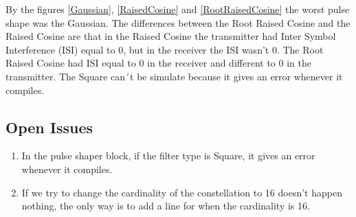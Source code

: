 By the figures \ref{Gaussian}, \ref{RaisedCosine} and \ref{RootRaisedCosine} the worst pulse shape was the Gaussian. The differences between the Root Raised Cosine and the Raised Cosine are that in the Raised Cosine the transmitter had Inter Symbol Interference (ISI) equal to 0, but in the receiver the ISI wasn't 0. The Root Raised Cosine had ISI equal to 0 in the receiver and different to 0 in the transmitter. The Square can´t be simulate because it gives an error whenever it compiles.

\subsection*{Open Issues}
\begin{enumerate}
    \item In the pulse shaper block, if the filter type is Square, it gives an error whenever it compiles.\par
    \item If we try to change the cardinality of the constellation to 16 doesn't happen nothing, the only way is to add a line for when the cardinality is 16.
\end{enumerate}

